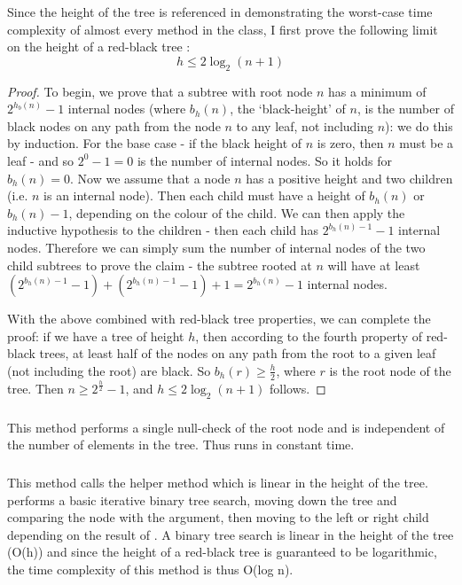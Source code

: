 Since the height of the tree is referenced in demonstrating the worst-case time complexity of almost every method in the class, I first prove the following limit on the height of a red-black tree \parencite{clrs}:
\begin{equation*}
h \leq 2\log_2(n+1)
\end{equation*}
\begin{proof}
To begin, we prove that a subtree with root node $n$ has a minimum of $2^{h_b(n)} - 1$ internal nodes (where $b_h(n)$, the `black-height' of $n$, is the number of black nodes on any path from the node $n$ to any leaf, not including $n$): we do this by induction. For the base case - if the black height of $n$ is zero, then $n$ must be a leaf - and so $2^0 - 1 = 0$ is the number of internal nodes. So it holds for $b_h(n) = 0$. Now we assume that a node $n$ has a positive height and two children (i.e. $n$ is an internal node). Then each child must have a height of $b_h(n)$ or $b_h(n) - 1$, depending on the colour of the child. We can then apply the inductive hypothesis to the children - then each child has $2^{b_h(n) - 1} - 1$ internal nodes. Therefore we can simply sum the number of internal nodes of the two child subtrees to prove the claim - the subtree rooted at $n$ will have at least $(2^{b_h(n) - 1} - 1) + (2^{b_h(n) - 1} - 1) + 1 = 2^{b_h(n)} - 1$ internal nodes.

With the above combined with red-black tree properties, we can complete the proof: if we have a tree of height $h$, then according to the fourth property of red-black trees, at least half of the nodes on any path from the root to a given leaf (not including the root) are black. So $b_h(r) \geq \frac{h}{2}$, where $r$ is the root node of the tree. Then $n \geq 2^{\frac h 2} - 1$, and $h \leq 2\log_2(n + 1)$ follows.
\end{proof}

\subsubsection{}
This method performs a single null-check of the root node and is independent of the number of elements in the tree. Thus  runs in constant time.

\subsubsection{}
This method calls the helper method  which is linear in the height of the tree.  performs a basic iterative binary tree search, moving down the tree and comparing the node with the argument, then moving to the left or right child depending on the result of . A binary tree search is linear in the height of the tree (O(h)) and since the height of a red-black tree is guaranteed to be logarithmic, the time complexity of this method is thus O(log n).


